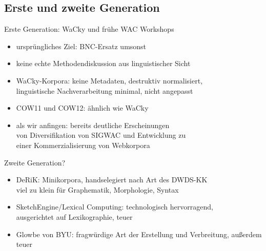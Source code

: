 
\subsection{Erste und zweite Generation}

\begin{frame}
	{Erste Generation: WaCky und frühe WAC Workshops}
	\begin{itemize}
  		\item ursprüngliches Ziel: BNC-Ersatz umsonst
  		\item keine echte Methodendiskussion aus linguistischer Sicht
  		\item WaCky-Korpora: keine Metadaten, destruktiv normalisiert,\\linguistische Nachverarbeitung minimal, nicht angepasst
  		\item COW11 und COW12: ähnlich wie WaCky 
  		
  		\vspace{0.5cm}
  			
  		\item als wir anfingen: bereits deutliche Erscheinungen\\von Diversifikation von SIGWAC und Entwicklung zu\\einer Kommerzialisierung von Webkorpora 
	\end{itemize}
\end{frame}

\begin{frame}
	{Zweite Generation?}
	\begin{itemize}
	  \item DeRiK: \alert{Minikorpora}, handselegiert nach Art des DWDS-KK\\\alert{viel zu klein} für Graphematik, Morphologie, Syntax
	  \item SketchEngine\slash Lexical Computing: technologisch hervorragend,\\ausgerichtet auf Lexikographie, \alert{teuer}
	  \item Glowbe von BYU: fragwürdige Art der Erstellung und Verbreitung, außerdem \alert{teuer}
	\end{itemize}
\end{frame}


